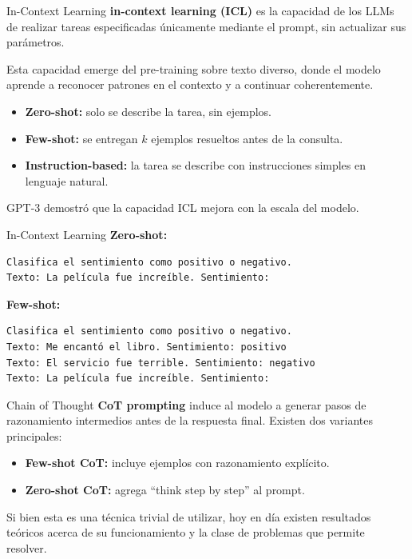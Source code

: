 \documentclass{beamer}
\begin{document}
\begin{frame}{In-Context Learning}
    \textbf{in-context learning (ICL)} es la capacidad de los LLMs de realizar tareas especificadas únicamente mediante el prompt, sin actualizar sus parámetros.

    Esta capacidad emerge del pre-training sobre texto diverso, donde el modelo aprende a reconocer patrones en el contexto y a continuar coherentemente.
    \begin{itemize}
        \item \textbf{Zero-shot:} solo se describe la tarea, sin ejemplos.
        \item \textbf{Few-shot:} se entregan $k$ ejemplos resueltos antes de la consulta.
        \item \textbf{Instruction-based:} la tarea se describe con instrucciones simples en lenguaje natural.
    \end{itemize}
    GPT-3 demostró que la capacidad ICL mejora con la escala del modelo.
\end{frame}

\begin{frame}[fragile]{In-Context Learning}
    \footnotesize
    \textbf{Zero-shot:}
    \begin{verbatim}
Clasifica el sentimiento como positivo o negativo.
Texto: La película fue increíble. Sentimiento:
    \end{verbatim}

    \textbf{Few-shot:}
    \begin{verbatim}
Clasifica el sentimiento como positivo o negativo.
Texto: Me encantó el libro. Sentimiento: positivo
Texto: El servicio fue terrible. Sentimiento: negativo
Texto: La película fue increíble. Sentimiento:
    \end{verbatim}
\end{frame}

\begin{frame}{Chain of Thought}
    \textbf{CoT prompting} induce al modelo a generar pasos de razonamiento intermedios antes de la respuesta final. Existen dos variantes principales:
    \begin{itemize}
        \item \textbf{Few-shot CoT:} incluye ejemplos con razonamiento explícito.
        \item \textbf{Zero-shot CoT:} agrega ``think step by step'' al prompt.
    \end{itemize}
    Si bien esta es una técnica trivial de utilizar, hoy en día existen resultados teóricos acerca de su funcionamiento y la clase de problemas que permite resolver.
\end{frame}
\end{document}
